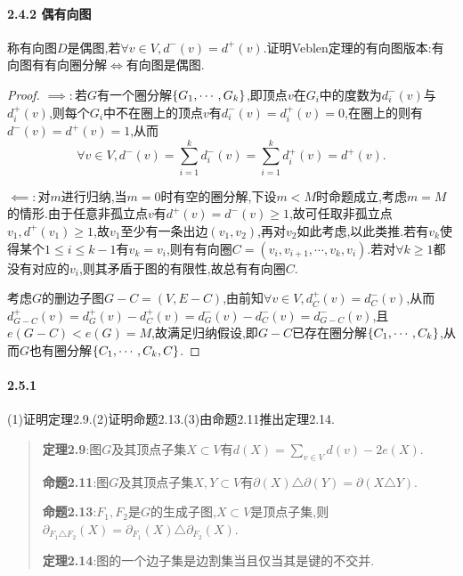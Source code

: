 \documentclass[11pt]{article}
\begin{document}
\paragraph{2.4.2 偶有向图}称有向图$D$是偶图,若$\forall v\in V, d^-(v)=d^+(v)$.证明Veblen定理的有向图版本:有向图有有向圈分解$\iff$有向图是偶图.
\begin{proof}
$\implies:$若$G$有一个圈分解$\left\{G_1,\cdots,G_k\right\}$,即顶点$v$在$G_i$中的度数为$d^-_i(v)$与$d^+_i(v)$,则每个$G_i$中不在圈上的顶点$v$有$d_i^-(v)=d_i^+(v)=0$,在圈上的则有$d^-(v)=d^+(v)=1$,从而$$\forall v\in V, d^-(v)=\sum_{i=1}^k d^-_i(v)=\sum_{i=1}^k d^+_i(v)=d^+(v).$$

$\impliedby:$对$m$进行归纳,当$m=0$时有空的圈分解,下设$m<M$时命题成立,考虑$m=M$的情形.由于任意非孤立点$v$有$d^+(v)=d^-(v)\geq 1$,故可任取非孤立点$v_1, d^+(v_1)\geq 1$,故$v_1$至少有一条出边$(v_1,v_2)$,再对$v_2$如此考虑,以此类推.若有$v_k$使得某个$1\leq i\leq k-1$有$v_k=v_i$,则有有向圈$C=(v_i,v_{i+1},\cdots,v_k,v_i)$.若对$\forall k\geq 1$都没有对应的$v_i$,则其矛盾于图的有限性,故总有有向圈$C$.

考虑$G$的删边子图$G-C=(V,E-C)$,由前知$\forall v\in V, d^+_C(v)=d^-_C(v)$,从而$d^+_{G-C}(v)=d^+_G(v)-d^+_C(v)=d^-_G(v)-d^-_C(v)=d^-_{G-C}(v)$,且$e(G-C)<e(G)=M$,故满足归纳假设,即$G-C$已存在圈分解$\left\{C_1,\cdots,C_k\right\}$,从而$G$也有圈分解$\left\{C_1,\cdots,C_k,C\right\}$.
\end{proof}

\paragraph{2.5.1}(1)证明定理2.9.(2)证明命题2.13.(3)由命题2.11推出定理2.14.
\begin{quote}
    \textbf{定理2.9}:图$G$及其顶点子集$X\subset V$有$d(X)=\sum_{v\in V}d(v)-2e(X)$.

    \textbf{命题2.11}:图$G$及其顶点子集$X,Y\subset V$有$\partial(X)\triangle\partial(Y)=\partial(X\triangle Y)$.

    \textbf{命题2.13}:$F_1,F_2$是$G$的生成子图,$X\subset V$是顶点子集,则$\partial_{F_1\triangle F_2}(X)=\partial_{F_1}(X)\triangle\partial_{F_2}(X)$.

    \textbf{定理2.14}:图的一个边子集是边割集当且仅当其是键的不交并.
\end{quote}
\end{document}
